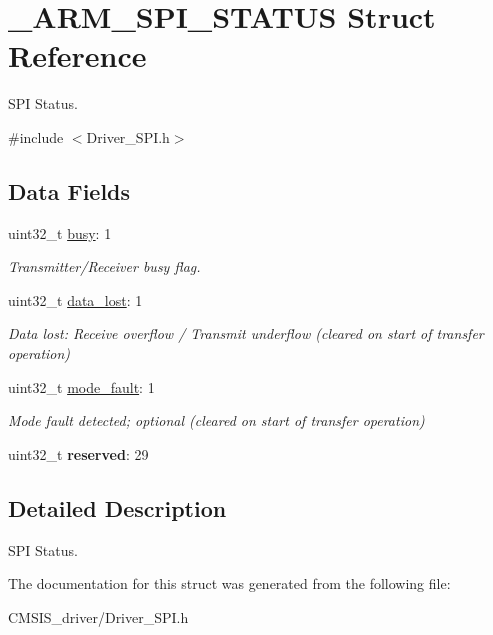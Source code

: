\hypertarget{struct___a_r_m___s_p_i___s_t_a_t_u_s}{}\section{\+\_\+\+A\+R\+M\+\_\+\+S\+P\+I\+\_\+\+S\+T\+A\+T\+US Struct Reference}
\label{struct___a_r_m___s_p_i___s_t_a_t_u_s}


S\+PI Status.  




{\ttfamily \#include $<$Driver\+\_\+\+S\+P\+I.\+h$>$}

\subsection*{Data Fields}
\begin{DoxyCompactItemize}
\item 
\mbox{\label{struct___a_r_m___s_p_i___s_t_a_t_u_s_a50c88f3c1d787773e2ac1b59533f034a}} 
uint32\+\_\+t \mbox{\hyperlink{struct___a_r_m___s_p_i___s_t_a_t_u_s_a50c88f3c1d787773e2ac1b59533f034a}{busy}}\+: 1
\begin{DoxyCompactList}\small\item\em Transmitter/\+Receiver busy flag. \end{DoxyCompactList}\item 
\mbox{\label{struct___a_r_m___s_p_i___s_t_a_t_u_s_a9675630df67587ecd171c7ef12b9d22a}} 
uint32\+\_\+t \mbox{\hyperlink{struct___a_r_m___s_p_i___s_t_a_t_u_s_a9675630df67587ecd171c7ef12b9d22a}{data\+\_\+lost}}\+: 1
\begin{DoxyCompactList}\small\item\em Data lost\+: Receive overflow / Transmit underflow (cleared on start of transfer operation) \end{DoxyCompactList}\item 
\mbox{\label{struct___a_r_m___s_p_i___s_t_a_t_u_s_aeaf54ec655b7a64b9e88578c5f39d4e3}} 
uint32\+\_\+t \mbox{\hyperlink{struct___a_r_m___s_p_i___s_t_a_t_u_s_aeaf54ec655b7a64b9e88578c5f39d4e3}{mode\+\_\+fault}}\+: 1
\begin{DoxyCompactList}\small\item\em Mode fault detected; optional (cleared on start of transfer operation) \end{DoxyCompactList}\item 
\mbox{\label{struct___a_r_m___s_p_i___s_t_a_t_u_s_aa43c4c21b173ada1b6b7568956f0d650}} 
uint32\+\_\+t {\bfseries reserved}\+: 29
\end{DoxyCompactItemize}


\subsection{Detailed Description}
S\+PI Status. 

The documentation for this struct was generated from the following file\+:\begin{DoxyCompactItemize}
\item 
C\+M\+S\+I\+S\+\_\+driver/Driver\+\_\+\+S\+P\+I.\+h\end{DoxyCompactItemize}
